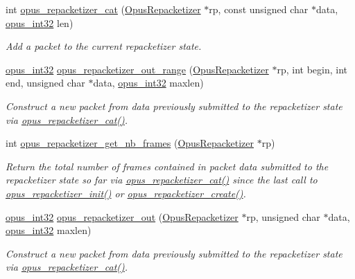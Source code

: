 \begin{DoxyCompactItemize}
int \hyperlink{group__opus__repacketizer_ga2840dd56bfa37f8c6874355b9ce8fb46}{opus\_\-repacketizer\_\-cat} (\hyperlink{group__opus__repacketizer_ga1f85070a64bcbf5bf24f5ccb80323e7b}{OpusRepacketizer} $\ast$rp, const unsigned char $\ast$data, \hyperlink{opus__types_8h_aa4d309d6f80b99dbabebc8f98879ab9a}{opus\_\-int32} len)
\begin{DoxyCompactList}\small\item\em Add a packet to the current repacketizer state. \item\end{DoxyCompactList}\item 
\hyperlink{opus__types_8h_aa4d309d6f80b99dbabebc8f98879ab9a}{opus\_\-int32} \hyperlink{group__opus__repacketizer_gac591b550d92125b4abfa11a4b609f51f}{opus\_\-repacketizer\_\-out\_\-range} (\hyperlink{group__opus__repacketizer_ga1f85070a64bcbf5bf24f5ccb80323e7b}{OpusRepacketizer} $\ast$rp, int begin, int end, unsigned char $\ast$data, \hyperlink{opus__types_8h_aa4d309d6f80b99dbabebc8f98879ab9a}{opus\_\-int32} maxlen)
\begin{DoxyCompactList}\small\item\em Construct a new packet from data previously submitted to the repacketizer state via \hyperlink{group__opus__repacketizer_ga2840dd56bfa37f8c6874355b9ce8fb46}{opus\_\-repacketizer\_\-cat()}. \item\end{DoxyCompactList}\item 
int \hyperlink{group__opus__repacketizer_ga2cad98d04458aafdf6bb9f22f34ea7c0}{opus\_\-repacketizer\_\-get\_\-nb\_\-frames} (\hyperlink{group__opus__repacketizer_ga1f85070a64bcbf5bf24f5ccb80323e7b}{OpusRepacketizer} $\ast$rp)
\begin{DoxyCompactList}\small\item\em Return the total number of frames contained in packet data submitted to the repacketizer state so far via \hyperlink{group__opus__repacketizer_ga2840dd56bfa37f8c6874355b9ce8fb46}{opus\_\-repacketizer\_\-cat()} since the last call to \hyperlink{group__opus__repacketizer_gab42ff7c3f8a49ff5029fcf60f3b853f0}{opus\_\-repacketizer\_\-init()} or \hyperlink{group__opus__repacketizer_ga6f8813666ef851550ecf8658a731ff7d}{opus\_\-repacketizer\_\-create()}. \item\end{DoxyCompactList}\item 
\hyperlink{opus__types_8h_aa4d309d6f80b99dbabebc8f98879ab9a}{opus\_\-int32} \hyperlink{group__opus__repacketizer_ga19ff1e91a8fa652380f972a224a26481}{opus\_\-repacketizer\_\-out} (\hyperlink{group__opus__repacketizer_ga1f85070a64bcbf5bf24f5ccb80323e7b}{OpusRepacketizer} $\ast$rp, unsigned char $\ast$data, \hyperlink{opus__types_8h_aa4d309d6f80b99dbabebc8f98879ab9a}{opus\_\-int32} maxlen)
\begin{DoxyCompactList}\small\item\em Construct a new packet from data previously submitted to the repacketizer state via \hyperlink{group__opus__repacketizer_ga2840dd56bfa37f8c6874355b9ce8fb46}{opus\_\-repacketizer\_\-cat()}. \item\end{DoxyCompactList}\end{DoxyCompactItemize}



